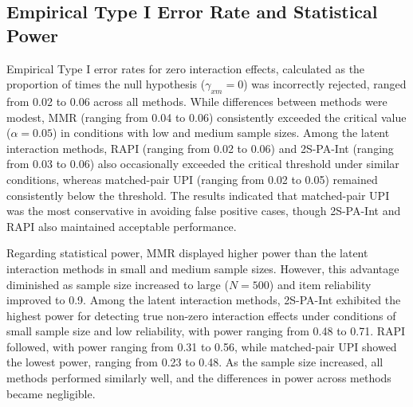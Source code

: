 \documentclass[
  man,mask]{apa6}
\begin{document}
\subsection{Empirical Type I Error Rate and Statistical Power}\label{empirical-type-i-error-rate-and-statistical-power-1}

Empirical Type I error rates for zero interaction effects, calculated as the proportion of times the null hypothesis (\(\gamma_{xm} = 0\)) was incorrectly rejected, ranged from 0.02 to 0.06 across all methods. While differences between methods were modest, MMR (ranging from 0.04 to 0.06) consistently exceeded the critical value (\(\alpha = 0.05\)) in conditions with low and medium sample sizes. Among the latent interaction methods, RAPI (ranging from 0.02 to 0.06) and 2S-PA-Int (ranging from 0.03 to 0.06) also occasionally exceeded the critical threshold under similar conditions, whereas matched-pair UPI (ranging from 0.02 to 0.05) remained consistently below the threshold. The results indicated that matched-pair UPI was the most conservative in avoiding false positive cases, though 2S-PA-Int and RAPI also maintained acceptable performance.

Regarding statistical power, MMR displayed higher power than the latent interaction methods in small and medium sample sizes. However, this advantage diminished as sample size increased to large (\(\textit{N} = 500\)) and item reliability improved to 0.9. Among the latent interaction methods, 2S-PA-Int exhibited the highest power for detecting true non-zero interaction effects under conditions of small sample size and low reliability, with power ranging from 0.48 to 0.71. RAPI followed, with power ranging from 0.31 to 0.56, while matched-pair UPI showed the lowest power, ranging from 0.23 to 0.48. As the sample size increased, all methods performed similarly well, and the differences in power across methods became negligible.
\end{document}
